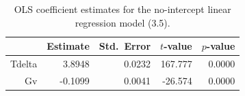 \begin{table}[ht]
\centering
\caption{OLS coefficient estimates for the no-intercept linear regression model (3.5).} 
\label{tab:lm_coef}
\begin{tabular}{rrrrr}
  \toprule
 & Estimate & Std.\ Error & $t$-value & $p$-value \\ 
  \midrule
Tdelta & 3.8948 & 0.0232 & 167.777 & 0.0000 \\ 
  Gv & -0.1099 & 0.0041 & -26.574 & 0.0000 \\ 
   \bottomrule
\end{tabular}
\end{table}
